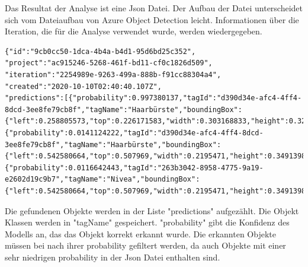 Das Resultat der Analyse ist eine Json Datei. 
Der Aufbau der Datei unterscheidet sich vom Dateiaufbau von Azure Object Detection leicht. Informationen über die Iteration, die für die Analyse verwendet wurde, werden wiedergegeben. 

\begin{lstlisting}
{"id":"9cb0cc50-1dca-4b4a-b4d1-95d6bd25c352",
"project":"ac915246-5268-461f-bd11-cf0c1826d509",
"iteration":"2254989e-9263-499a-888b-f91cc88304a4",
"created":"2020-10-10T02:40:40.107Z",
"predictions":[{"probability":0.997380137,"tagId":"d390d34e-afc4-4ff4-8dcd-3ee8fe79cb8f","tagName":"Haarbürste","boundingBox":{"left":0.258805573,"top":0.226171583,"width":0.303168833,"height":0.329167157}},
{"probability":0.0141124222,"tagId":"d390d34e-afc4-4ff4-8dcd-3ee8fe79cb8f","tagName":"Haarbürste","boundingBox":{"left":0.542580664,"top":0.507969,"width":0.2195471,"height":0.3491398}},
{"probability":0.0116642443,"tagId":"263b3042-8958-4775-9a19-e2602d19c9b7","tagName":"Nivea","boundingBox":{"left":0.542580664,"top":0.507969,"width":0.2195471,"height":0.3491398}}]}
\end{lstlisting}

Die gefundenen Objekte werden in der Liste "predictions" aufgezählt. Die Objekt Klassen werden in "tagName" gespeichert. "probability" gibt die Konfidenz des Modells an, das das Objekt korrekt erkannt wurde. Die erkannten Objekte müssen bei nach ihrer probability gefiltert werden, da auch Objekte mit einer sehr niedrigen probability in der Json Datei enthalten sind. 